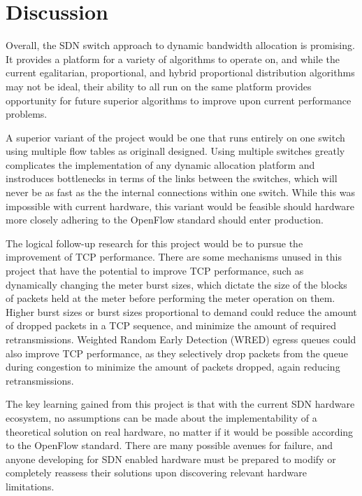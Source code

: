 \documentclass[accepted,single]{gipaper}
\begin{document}
\section{Discussion}
\label{discussion}

Overall, the SDN switch approach to dynamic bandwidth allocation is promising. It provides a platform for a variety of algorithms to operate on, and while the current egalitarian, proportional, and hybrid proportional distribution algorithms may not be ideal, their ability to all run on the same platform provides opportunity for future superior algorithms to improve upon current performance problems.

A superior variant of the project would be one that runs entirely on one switch using multiple flow tables as originall designed. Using multiple switches greatly complicates the implementation of any dynamic allocation platform and instroduces bottlenecks in terms of the links between the switches, which will never be as fast as the the internal connections within one switch. While this was impossible with current hardware, this variant would be feasible should hardware more closely adhering to the OpenFlow standard should enter production.

The logical follow-up research for this project would be to pursue the improvement of TCP performance. There are some mechanisms unused in this project that have the potential to improve TCP performance, such as dynamically changing the meter burst sizes, which dictate the size of the blocks of packets held at the meter before performing the meter operation on them. Higher burst sizes or burst sizes proportional to demand could reduce the amount of dropped packets in a TCP sequence, and minimize the amount of required retransmissions. Weighted Random Early Detection (WRED) egress queues could also improve TCP performance, as they selectively drop packets from the queue during congestion to minimize the amount of packets dropped, again reducing retransmissions.

The key learning gained from this project is that with the current SDN hardware ecosystem, no assumptions can be made about the implementability of a theoretical solution on real hardware, no matter if it would be possible according to the OpenFlow standard. There are many possible avenues for failure, and anyone developing for SDN enabled hardware must be prepared to modify or completely reassess their solutions upon discovering relevant hardware limitations.
\end{document}
